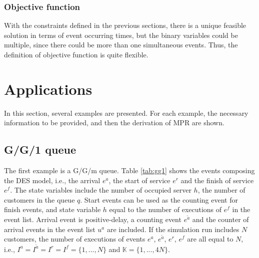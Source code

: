 \documentclass[]{interact}
\theoremstyle{plain}%
\theoremstyle{definition}
\theoremstyle{remark}
\begin{document}
\subsubsection{Objective function}
With the constraints defined in the previous sections, there is a unique feasible solution in terms of event occurring times, but the binary variables could be multiple, since there could be more than one simultaneous events. Thus, the definition of objective function is quite flexible. 

\section{Applications}

In this section, several examples are presented. For each example, the necessary information to be provided, and then the derivation of MPR are shown.
\subsection{G/G/1 queue}
The first example is a G/G/m queue. Table \ref{tab:gg1} shows the events composing the DES model, i.e., the arrival $e^a$, the start of service $e^{r}$ and the finish of service $e^{f}$. The state variables include the number of occupied server $h$, the number of customers in the queue $q$. 
Start events can be used as the counting event for finish events, and state variable $h$ equal to the number of executions of $e^{f}$ in the event list.
Arrival event is positive-delay, a counting event $e^{\tilde{a}}$ and the counter of arrival events in the event list $u^a$ are included. 
If the simulation run includes $N$ customers, the number of executions of events $e^a$, $e^{\tilde{a}}$, $e^r$, $e^f$ are all equal to $N$, i.e., $I^{a}=I^{\tilde{a}}=I^{r}=I^{f}=\{1,...,N\}$ and $\mathbb{K}=\{1,...,4N\}$. 
\end{document}
